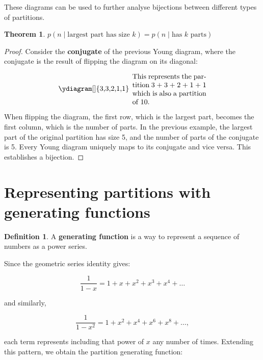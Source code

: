 \documentclass{article}
\theoremstyle{definition}
\newtheorem{definition}{Definition}
\newtheorem{theorem}{Theorem}
\begin{document}
\noindent
These diagrams can be used to further analyse bijections between different types of partitions.

\begin{theorem}
    $p(n \mid \text{largest part has size $k$}) = p(n \mid \text{has $k$ parts})$
\end{theorem}

\begin{proof}
Consider the \textbf{conjugate} of the previous Young diagram, where the conjugate is the result of
flipping the diagram on its diagonal:

\[
\begin{minipage}{0.3\textwidth}
    \ydiagram[]
        {3,3,2,1,1}
\end{minipage}
\begin{minipage}{0.3\textwidth}
    This represents the partition 3 + 3 + 2 + 1 + 1 which is also a partition of 10.
\end{minipage}
\]

\noindent
When flipping the diagram, the first row, which is the largest part, becomes the first column, which is the
number of parts. In the previous example, the largest part of the original partition has size 5, and the number of
parts of the conjugate is 5.
\newline Every Young diagram uniquely maps to its conjugate and vice versa. This establishes a bijection.
\end{proof}

\section{Representing partitions with generating functions}

\begin{definition}
    A \textbf{generating function} is a way to represent a sequence of numbers as a power series. 
\end{definition}

\noindent
Since the geometric series identity gives:

\[
\frac{1}{1 - x} = 1 + x + x^2 + x^3 + x^4 + \dots
\]

\noindent
and similarly,

\[
\frac{1}{1 - x^2} = 1 + x^2 + x^4 + x^6 + x^8 + \dots,
\]

\noindent
each term represents including that power of \( x \) any number of times. Extending this pattern, we obtain
the partition generating function:
\end{document}
